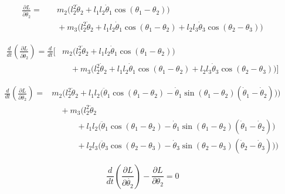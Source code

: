 \documentclass[11pt,a4paper]{article}
\begin{document}
\begin{align*}
    \frac{\partial L}{\partial \dot\theta_2} =&\quad m_2 \big( l_2^2 \dot{\theta}_2 + l_1 l_2 \dot{\theta}_1 \cos(\theta_1 - \theta_2) \big) \\
    &\quad + m_3 \Big( l_2^2 \dot{\theta}_2 + l_1 l_2 \dot{\theta}_1 \cos(\theta_1 - \theta_2) + l_2 l_3 \dot{\theta}_3 \cos(\theta_2 - \theta_3) \Big)
\end{align*}

\begin{align*}
    \frac{d}{dt} \left( \frac{\partial L}{\partial \dot{\theta}_2} \right) = \frac{d}{dt} \biggl[
    & m_2 \big( l_2^2 \dot{\theta}_2 + l_1 l_2 \dot{\theta}_1 \cos(\theta_1 - \theta_2) \big) \\
    &\quad + m_3 \Big( l_2^2 \dot{\theta}_2 + l_1 l_2 \dot{\theta}_1 \cos(\theta_1 - \theta_2) + l_2 l_3 \dot{\theta}_3 \cos(\theta_2 - \theta_3) \Big) \biggr]
\end{align*}

\begin{align*}
    \frac{d}{dt} \left( \frac{\partial L}{\partial \dot{\theta}_2} \right) = 
    & m_2 \Big( l_2^2 \ddot{\theta}_2 + l_1 l_2 \big( \ddot{\theta}_1 \cos(\theta_1 - \theta_2) - \dot{\theta}_1 \sin(\theta_1 - \theta_2)(\dot{\theta}_1 - \dot{\theta}_2) \big) \Big) \\
    &\quad + m_3 \Big( l_2^2 \ddot{\theta}_2 \\
    &\qquad\quad + l_1 l_2 \big(\ddot{\theta}_1 \cos(\theta_1 - \theta_2) - \dot{\theta}_1 \sin(\theta_1 - \theta_2)(\dot{\theta}_1 - \dot{\theta}_2)\big) \\
    &\qquad\quad + l_2 l_3 \big (\ddot{\theta}_3 \cos(\theta_2 - \theta_3) - \dot{\theta}_3 \sin(\theta_2 - \theta_3)(\dot{\theta}_2 - \dot{\theta}_3) \big) \Big)
\end{align*}

\[ \frac{d}{dt} \left( \frac{\partial L}{\partial \dot{\theta_2}} \right) - \frac{\partial L}{\partial \theta_2} = 0 \]
\end{document}
